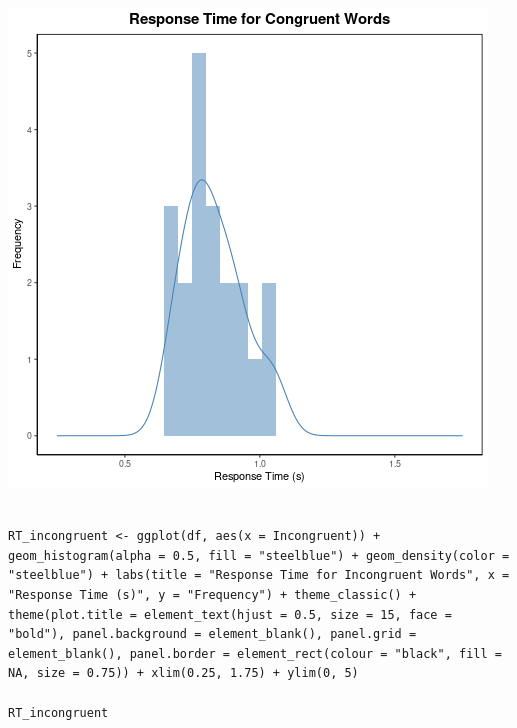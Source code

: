 \documentclass{article}
\begin{document}
\begin{center}
\includegraphics[width=.9\linewidth]{converted_stroop5.png}
\end{center}




\begin{verbatim}

RT_incongruent <- ggplot(df, aes(x = Incongruent)) + geom_histogram(alpha = 0.5, fill = "steelblue") + geom_density(color = "steelblue") + labs(title = "Response Time for Incongruent Words", x = "Response Time (s)", y = "Frequency") + theme_classic() + theme(plot.title = element_text(hjust = 0.5, size = 15, face = "bold"), panel.background = element_blank(), panel.grid = element_blank(), panel.border = element_rect(colour = "black", fill = NA, size = 0.75)) + xlim(0.25, 1.75) + ylim(0, 5)

RT_incongruent

\end{verbatim}
\end{document}
